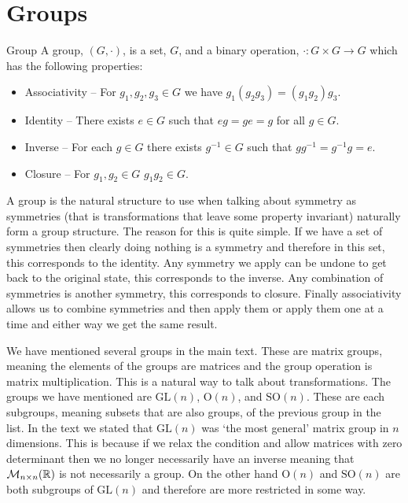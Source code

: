 \documentclass[a4paper]{article}
\newcommand{\nxmMatrices}[3]{\mathcal{M}_{{#1}\times{#2}}({#3})}
\newcommand{\generalLinearGroup}{\mathrm{GL}}
\newcommand{\orthogonalGroup}{\mathrm{O}}
\newcommand{\specialOrthogonalGroup}{\mathrm{SO}}
\begin{document}
    \section{Groups}\label{app:groups}
    \begin{definition}{Group}{}
        A group, \((G, \cdot)\), is a set, \(G\), and a binary operation, \(\cdot\colon G\times G\to G\) which has the following properties:
        \begin{itemize}
            \item Associativity -- For \(g_1, g_2, g_3\in G\) we have \(g_1(g_2g_3) = (g_1g_2)g_3\).
            \item Identity -- There exists \(e\in G\) such that \(eg = ge = g\) for all \(g\in G\).
            \item Inverse -- For each \(g\in G\) there exists \(g^{-1}\in G\) such that \(gg^{-1} = g^{-1}g = e\).
            \item Closure -- For \(g_1, g_2\in G\) \(g_1g_2\in G\).
        \end{itemize}
    \end{definition}
    A group is the natural structure to use when talking about symmetry as symmetries (that is transformations that leave some property invariant) naturally form a group structure.
    The reason for this is quite simple.
    If we have a set of symmetries then clearly doing nothing is a symmetry and therefore in this set, this corresponds to the identity.
    Any symmetry we apply can be undone to get back to the original state, this corresponds to the inverse.
    Any combination of symmetries is another symmetry, this corresponds to closure.
    Finally associativity allows us to combine symmetries and then apply them or apply them one at a time and either way we get the same result.
    
    We have mentioned several groups in the main text.
    These are matrix groups, meaning the elements of the groups are matrices and the group operation is matrix multiplication.
    This is a natural way to talk about transformations.
    The groups we have mentioned are \(\generalLinearGroup(n)\), \(\orthogonalGroup(n)\), and \(\specialOrthogonalGroup(n)\).
    These are each subgroups, meaning subsets that are also groups, of the previous group in the list.
    In the text we stated that \(\generalLinearGroup(n)\) was `the most general' matrix group in \(n\) dimensions.
    This is because if we relax the condition and allow matrices with zero determinant then we no longer necessarily have an inverse meaning that \(\nxmMatrices{n}{n}{\reals}\) is not necessarily a group.
    On the other hand \(\orthogonalGroup(n)\) and \(\specialOrthogonalGroup(n)\) are both subgroups of \(\generalLinearGroup(n)\) and therefore are more restricted in some way.
    
\end{document}
